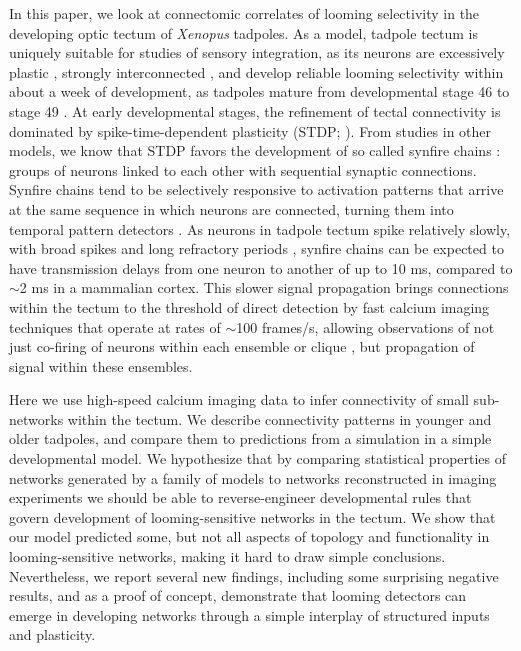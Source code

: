 \documentclass{article}
\begin{document}
In this paper, we look at connectomic correlates of looming selectivity in the developing optic tectum of \textit{Xenopus} tadpoles. As a model, tadpole tectum is uniquely suitable for studies of sensory integration, as its neurons are excessively plastic \citep{pratt2007intrinsic,busch2019}, strongly interconnected \citep{james2015}, and develop reliable looming selectivity within about a week of development, as tadpoles mature from developmental stage 46 to stage 49 \citep{dong2009,khakhalin2014}. At early developmental stages, the refinement of tectal connectivity is dominated by spike-time-dependent plasticity (STDP; \citealt{zhang1998stdp,mu2006stdp,vislay2006rf,richards2010stdp}). From studies in other models, we know that STDP favors the development of so called synfire chains \citep{fiete2010chains,zheng2014synfire}: groups of neurons linked to each other with sequential synaptic connections. Synfire chains tend to be selectively responsive to activation patterns that arrive at the same sequence in which neurons are connected, turning them into temporal pattern detectors \citep{clopath2010stdpcoding}. As neurons in tadpole tectum spike relatively slowly, with broad spikes and long refractory periods \citep{ciarleglio2015,jang2016,busch2019}, synfire chains can be expected to have transmission delays from one neuron to another of up to 10 ms, compared to $\sim$2 ms in a mammalian cortex. This slower signal propagation brings connections within the tectum to the threshold of direct detection by fast calcium imaging techniques that operate at rates of $\sim$100 frames/s, allowing observations of not just co-firing of neurons within each ensemble or clique \citep{reimann2017,avitan2017spontaneous}, but propagation of signal within these ensembles.

Here we use high-speed calcium imaging data to infer connectivity of small sub-networks within the tectum. We describe connectivity patterns in younger and older tadpoles, and compare them to predictions from a simulation in a simple developmental model. We hypothesize that by comparing statistical properties of networks generated by a family of models to networks reconstructed in imaging experiments we should be able to reverse-engineer developmental rules that govern development of looming-sensitive networks in the tectum. We show that our model predicted some, but not all aspects of topology and functionality in looming-sensitive networks, making it hard to draw simple conclusions. Nevertheless, we report several new findings, including some surprising negative results, and as a proof of concept, demonstrate that looming detectors can emerge in developing networks through a simple interplay of structured inputs and plasticity.
\end{document}
